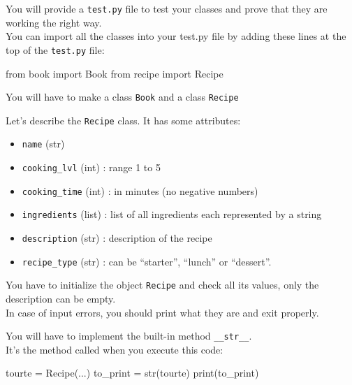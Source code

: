 \documentclass[]{article}
\newenvironment{Shaded}{\begin{snugshade}}{\end{snugshade}}
\newcommand{\BuiltInTok}[1]{\textcolor[rgb]{0.50,0.55,0.55}{#1}}
\newcommand{\ImportTok}[1]{\textcolor[rgb]{0.15,0.68,0.38}{#1}}
\newcommand{\NormalTok}[1]{\textcolor[rgb]{0.81,0.81,0.76}{#1}}
\newcommand{\OperatorTok}[1]{\textcolor[rgb]{0.81,0.81,0.76}{#1}}
\begin{document}
You will provide a \texttt{test.py} file to test your classes and prove
that they are working the right way.\\
You can import all the classes into your test.py file by adding these
lines at the top of the \texttt{test.py} file:

\begin{Shaded}
\begin{Highlighting}[]
\ImportTok{from}\NormalTok{ book }\ImportTok{import}\NormalTok{ Book}
\ImportTok{from}\NormalTok{ recipe }\ImportTok{import}\NormalTok{ Recipe}
\end{Highlighting}
\end{Shaded}

You will have to make a class \texttt{Book} and a class \texttt{Recipe}

Let's describe the \texttt{Recipe} class. It has some attributes:

\begin{itemize}
\item
  \texttt{name} (str)
\item
  \texttt{cooking\_lvl} (int) : range 1 to 5
\item
  \texttt{cooking\_time} (int) : in minutes (no negative numbers)
\item
  \texttt{ingredients} (list) : list of all ingredients each represented
  by a string
\item
  \texttt{description} (str) : description of the recipe
\item
  \texttt{recipe\_type} (str) : can be ``starter'', ``lunch'' or
  ``dessert''.
\end{itemize}

You have to initialize the object \texttt{Recipe} and check all its
values, only the description can be empty.\\
In case of input errors, you should print what they are and exit
properly.

You will have to implement the built-in method \texttt{\_\_str\_\_}.\\
It's the method called when you execute this code:

\begin{Shaded}
\begin{Highlighting}[]
\NormalTok{tourte }\OperatorTok{=}\NormalTok{ Recipe(...)}
\NormalTok{to_print }\OperatorTok{=} \BuiltInTok{str}\NormalTok{(tourte)}
\BuiltInTok{print}\NormalTok{(to_print)}
\end{Highlighting}
\end{Shaded}
\end{document}
